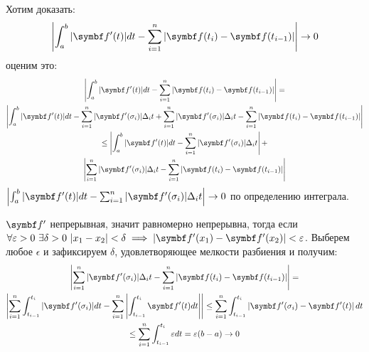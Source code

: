 \documentclass[main]{subfiles}
\begin{document}
\begin{longProof}
    Хотим доказать:
    \[\left| \int_a^b |\vf'(t)| dt - \sum_{i=1}^n |\vf(t_i) - \vf(t_{i-1})|\right| \to 0\]
    оценим это:
    \begin{multline*}
        \left| \int_a^b |\vf'(t)| dt - \sum_{i=1}^n |\vf(t_i) - \vf(t_{i-1})|\right| = \\
        \left| \int_a^b |\vf'(t)| dt - \sum_{i=1}^n |\vf'(\sigma_i)| \Delta_i t  + \sum_{i=1}^n |\vf' (\sigma_i)| \Delta_i t - \sum_{i=1}^n |\vf(t_i) - \vf(t_{i-1})| \right| \\
        \le \left| \int_a^b |\vf'(t)| dt - \sum_{i=1}^n |\vf'(\sigma_i)| \Delta_i t \right|  +\\
        \left| \sum_{i=1}^n |\vf' (\sigma_i)| \Delta_i t - \sum_{i=1}^n |\vf(t_i) - \vf(t_{i-1})| \right|
    \end{multline*}
    $\left| \int_a^b |\vf'(t)| dt - \sum_{i=1}^n |\vf'(\sigma_i)| \Delta_i t \right| \to 0$ по определению интеграла.

    $\vf'$ непрерывная, значит равномерно непрерывна, тогда если
    $\forall \epsilon > 0\  \exists \delta > 0\  |x_1 - x_2| < \delta \implies |\vf'(x_1) - \vf'(x_2)| < \epsilon$.
    Выберем любое $\epsilon$ и зафиксируем $\delta$, удовлетворяющее мелкости разбиения и получим:
    \begin{multline*}
        \left| \sum_{i=1}^n |\vf' (\sigma_i)| \Delta_i t - \sum_{i=1}^n |\vf(t_i) - \vf(t_{i-1})| \right| =\\
        \left|\sum_{i=1}^n \int_{t_{i-1}}^{t_i} |\vf'(\sigma_i)|dt -  \sum_{i=1}^n \left|\int_{t_{i-1}}^{t_i} \vf'(t)dt\right|\right|
        \le \sum_{i=1}^n \int_{t_{i-1}}^{t_i} \left|\vf'(\sigma_i) - \vf'(t) \right|dt \\
        \le \sum_{i=1}^n \int_{t_{i-1}}^{t_i} \epsilon dt = \epsilon (b-a) \to 0
    \end{multline*}
\end{longProof}
\end{document}
